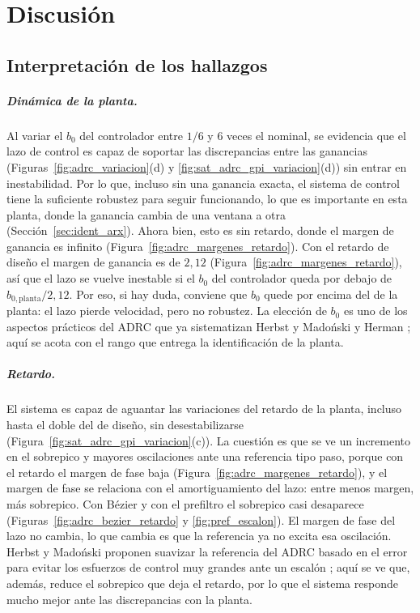 \chapter{Discusión}
\label{cap:discusion}

\section{Interpretación de los hallazgos}
\label{sec:hipotesis_discusion}

\paragraph{Dinámica de la planta.} Al variar el $b_0$ del controlador entre $1/6$ y $6$ veces el
nominal, se evidencia que el lazo de control es capaz de soportar las discrepancias entre las
ganancias (Figuras~\ref{fig:adrc_variacion}(d) y \ref{fig:sat_adrc_gpi_variacion}(d)) sin entrar en
inestabilidad. Por lo que, incluso sin una ganancia exacta, el sistema de control tiene la suficiente
robustez para seguir funcionando, lo que es importante en esta planta, donde la ganancia cambia de una
ventana a otra (Sección~\ref{sec:ident_arx}). Ahora bien, esto es sin retardo, donde el margen de
ganancia es infinito (Figura~\ref{fig:adrc_margenes_retardo}). Con el retardo de diseño el margen de
ganancia es de $2{,}12$ (Figura~\ref{fig:adrc_margenes_retardo}), así que el lazo se vuelve inestable
si el $b_0$ del controlador queda por debajo de $b_{0,\mathrm{planta}}/2{,}12$. Por eso, si hay duda, conviene que $b_0$ quede por encima del de
la planta: el lazo pierde velocidad, pero no robustez. La elección de $b_0$ es uno de los aspectos
prácticos del ADRC que ya sistematizan Herbst \cite{herbst2013practical} y Madoński y Herman
\cite{madonski2015survey}; aquí se acota con el rango que entrega la identificación de la planta.

\paragraph{Retardo.} El sistema es capaz de aguantar las variaciones del retardo de la planta,
incluso hasta el doble del de diseño, sin desestabilizarse (Figura~\ref{fig:sat_adrc_gpi_variacion}(c)).
La cuestión es que se ve un incremento en el sobrepico y mayores oscilaciones ante una referencia tipo
paso, porque con el retardo el margen de fase baja (Figura~\ref{fig:adrc_margenes_retardo}), y el
margen de fase se relaciona con el amortiguamiento del lazo: entre menos margen, más sobrepico. Con
Bézier y con el prefiltro el sobrepico casi desaparece (Figuras~\ref{fig:adrc_bezier_retardo} y
\ref{fig:pref_escalon}). El margen de fase del lazo no cambia, lo que cambia es que la referencia ya no
excita esa oscilación. Herbst y Madoński proponen suavizar la referencia del ADRC basado en el error
para evitar los esfuerzos de control muy grandes ante un escalón \cite[fig.~6.13 y
sec.~6.4.2]{herbst2024adrc}; aquí se ve que, además, reduce el sobrepico que deja el retardo, por lo
que el sistema responde mucho mejor ante las discrepancias con la planta.

